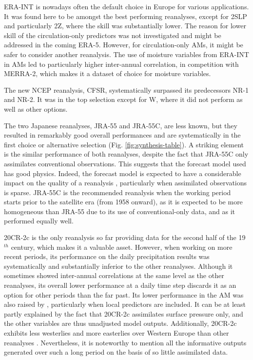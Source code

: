 \documentclass{ametsoc}
\begin{document}
ERA-INT is nowadays often the default choice in Europe for various applications. It was found here to be amongst the best performing reanalyses, except for 2SLP and particularly 2Z, where the skill was substantially lower. The reason for lower skill of the circulation-only predictors was not investigated and might be addressed in the coming ERA-5. However, for circulation-only AMs, it might be safer to consider another reanalysis. The use of moisture variables from ERA-INT in AMs led to particularly higher inter-annual correlation, in competition with MERRA-2, which makes it a dataset of choice for moisture variables.

The new NCEP reanalysis, CFSR, systematically surpassed its predecessors NR-1 and NR-2. It was in the top selection except for W, where it did not perform as well as other options.

The two Japanese reanalyses, JRA-55 and JRA-55C, are less known, but they resulted in remarkably good overall performances and are systematically in the first choice or alternative selection (Fig. \ref{fig:synthesis-table}). A striking element is the similar performance of both reanalyses, despite the fact that JRA-55C only assimilates conventional observations. This suggests that the forecast model used has good physics. Indeed, the forecast model is expected to have a considerable impact on the quality of a reanalysis \citep{Kobayashi2015}, particularly when assimilated observations is sparse. JRA-55C is the recommended reanalysis when the working period starts prior to the satellite era (from 1958 onward), as it is expected to be more homogeneous than JRA-55 due to its use of conventional-only data, and as it performed equally well.

20CR-2c is the only reanalysis so far providing data for the second half of the 19$^{th}$ century, which makes it a valuable asset. However, when working on more recent periods, its performance on the daily precipitation results was systematically and substantially inferior to the other reanalyses. Although it sometimes showed inter-annual correlations at the same level as the other reanalyses, its overall lower performance at a daily time step discards it as an option for other periods than the far past. Its lower performance in the AM was also raised by \citet[][]{Dayon2015}, particularly when local predictors are included. It can be at least partly explained by the fact that 20CR-2c assimilates surface pressure only, and the other variables are thus unadjusted model outputs. Additionally, 20CR-2c exhibits less westerlies and more easterlies over Western Europe than other reanalyses \citep{Rohrer2018}. Nevertheless, it is noteworthy to mention all the informative outputs generated over such a long period on the basis of so little assimilated data.
\end{document}
